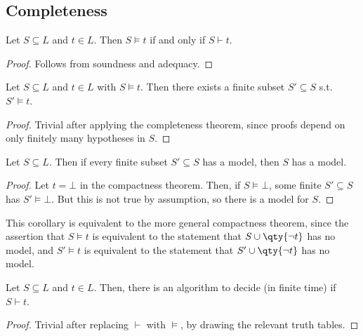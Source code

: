 \subsection{Completeness}
\begin{theorem}
    Let $S \subseteq L$ and $t \in L$.
    Then $S \models t$ if and only if $S \vdash t$.
\end{theorem}
\begin{proof}
    Follows from soundness and adequacy.
\end{proof}
\begin{theorem}
    Let $S \subseteq L$ and $t \in L$ with $S \models t$.
    Then there exists a finite subset $S' \subseteq S$ s.t. $S' \models t$.
\end{theorem}
\begin{proof}
    Trivial after applying the completeness theorem, since proofs depend on only finitely many hypotheses in $S$.
\end{proof}
\begin{corollary}
    Let $S \subseteq L$.
    Then if every finite subset $S' \subseteq S$ has a model, then $S$ has a model.
\end{corollary}
\begin{proof}
    Let $t = \bot$ in the compactness theorem.
    Then, if $S \models \bot$, some finite $S' \subseteq S$ has $S' \models \bot$.
    But this is not true by assumption, so there is a model for $S$.
\end{proof}
\begin{remark}
    This corollary is equivalent to the more general compactness theorem, since the assertion that $S \models t$ is equivalent to the statement that $S \cup \qty{\neg t}$ has no model, and $S' \models t$ is equivalent to the statement that $S' \cup \qty{\neg t}$ has no model.
\end{remark}
\begin{theorem}
    Let $S \subseteq L$ and $t \in L$.
    Then, there is an algorithm to decide (in finite time) if $S \vdash t$.
\end{theorem}
\begin{proof}
    Trivial after replacing $\vdash$ with $\models$, by drawing the relevant truth tables.
\end{proof}
